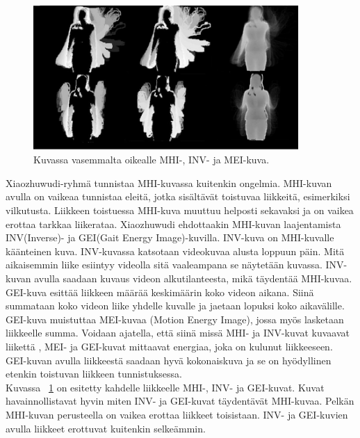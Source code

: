 \begin{figure}[htb]
  \begin{center}
    \includegraphics[width=0.9\textwidth]{mhi_ex.jpg}
    \caption{Kuvassa vasemmalta oikealle MHI-, INV- ja MEI-kuva. \citep {6239179}}
    \label{fig:mhiinvmei}
  \end{center}
\end{figure}

Xiaozhuwudi-ryhmä tunnistaa MHI-kuvassa kuitenkin ongelmia. MHI-kuvan avulla on vaikeaa tunnistaa eleitä, jotka sisältävät toistuvaa liikkeitä, 
esimerkiksi vilkutusta.
Liikkeen toistuessa MHI-kuva muuttuu helposti sekavaksi ja on vaikea erottaa tarkkaa liikerataa. Xiaozhuwudi ehdottaakin MHI-kuvan laajentamista 
INV(Inverse)- ja GEI(Gait Energy Image)-kuvilla. INV-kuva on MHI-kuvalle käänteinen kuva. INV-kuvassa katsotaan videokuvaa alusta loppuun päin.
Mitä aikaisemmin liike esiintyy videolla sitä vaaleampana se näytetään kuvassa. INV-kuvan avulla saadaan kuvaus videon alkutilanteesta, mikä täydentää MHI-kuvaa. 
GEI-kuva esittää liikkeen määrää keskimäärin koko videon aikana. Siinä summataan koko videon liike yhdelle kuvalle ja jaetaan lopuksi koko aikavälille.
GEI-kuva muistuttaa MEI-kuvaa (Motion Energy Image), jossa myös lasketaan liikkeelle summa. Voidaan ajatella, että siinä missä MHI- ja INV-kuvat kuvaavat liikettä ,
MEI- ja GEI-kuvat mittaavat energiaa, joka on kulunut liikkeeseen. GEI-kuvan avulla liikkeestä saadaan hyvä kokonaiskuva ja se on hyödyllinen etenkin toistuvan
liikkeen tunnistuksessa. \citep {6239179} \\

Kuvassa ~\ref{fig:mhiinvmei} on esitetty kahdelle
liikkeelle MHI-, INV- ja GEI-kuvat. Kuvat havainnollistavat hyvin miten INV- ja GEI-kuvat
täydentävät MHI-kuvaa. Pelkän MHI-kuvan perusteella on vaikea erottaa liikkeet toisistaan.
INV- ja GEI-kuvien avulla liikkeet erottuvat kuitenkin selkeämmin. \\

